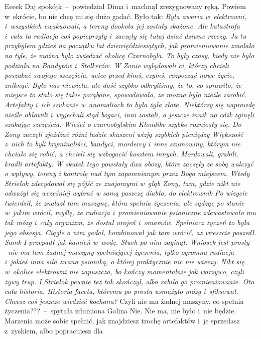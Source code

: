 \documentclass[../MAIN.tex]{subfiles}
\begin{document}
\xx  Eeee\3k Daj spokój\3k~--~powiedział Dima i~machnął zrezygnowany ręką.
Powiem w~skrócie, bo nie chcę mi się dużo gadać. Było tak:
\qd
\textsl{Była awaria w~elektrowni, i~wszystkich ewakuowali, a tereny dookoła jej
zostały
skażone. Ale katastrofa i~cała ta radiacja coś popieprzyły i~zaczęły się tutaj
dziać dziwne rzeczy. Ja tu przybyłem gdzieś na początku lat dziewięćdziesiątych,
jak promieniowanie zmalało na tyle, że można było zwiedzać okolicę Czarnobyla.
To były czasy, kiedy nie było podziału na Bandytów i~Stalkerów. W Zonie
wylądowali ci, którzy chcieli poszukać swojego szczęścia, uciec przed kimś,
czymś, rozpocząć nowe życie, zniknąć. Było nas niewielu, ale dość szybko
odkryliśmy, że to, co sprawiło, że miejsce to stało się takie porąbane,
spowodowało, że można było nieźle zarobić. Artefakty i~ich szukanie w~anomaliach
to była żyła złota. Niektórzy się naprawdę nieźle obłowili i~wyjechali stąd
bogaci, inni zostali, a jeszcze inni\3k no cóż\3k zginęli szukając
szczęścia. Wieści o czarnobylskim Klondike szybko rozniosły się. Do Zony zaczęli
zjeżdżać różni ludzie skuszeni wizją szybkich pieniędzy Większość z~nich to byli
kryminaliści, bandyci, mordercy i~inne szumowiny, którym nie chciało się robić,
a chcieli się wzbogacić kosztem innych. Mordowali, grabili, kradli artefakty. W
skutek tego powstały dwa obozy, które zaczęły ze sobą walczyć o wpływy, tereny i
kontrolę nad tym zapomnianym przez Boga miejscem. Wtedy Striełok zdecydował się
pójść ze znajomymi w~głąb Zony, tam, gdzie nikt nie odważył się wcześniej wybrać
w samą paszczę diabła, do elektrowni\3k Po wizycie twierdził, że znalazł
tam maszynę, która spełnia życzenia, ale sądząc po stanie w~jakim wrócił, myślę,
że radiacja i~promieniowanie psioniczne zdewastowało mu tak mózg i~cały
organizm, że dostał urojeń i~omamów. Spełniacz życzeń to była jego obsesja.
Ciągle o nim gadał, kombinował jak tam wrócić, aż wreszcie poszedł. Sam\3k I
przepadł jak kamień w~wodę. Słuch po nim zaginął.
Wniosek jest prosty~--~nie ma
tam żadnej maszyny spełniającej życzenia, tylko ogromna radiacja i~jakieś inna
siła zwana psioniką, o której praktycznie nic nie wiemy. Nikt się w~okolice
elektrowni nie zapuszcza, bo kończy momentalnie jak warzywo, czyli żywy trup. I
Striełok pewnie też tak skończył, albo zabiło go promieniowanie. Oto cała
historia. Historia faceta, któremu po prostu usmażyło mózg i~sfiksował. Chcesz
coś jeszcze wiedzieć kochana?}
\sx
Czyli nie ma żadnej maszyny, co spełnia życzenia???~--~spytała zdumiona
Galina
\xx  Nie. Nie ma, nie było i~nie będzie. Marzenia może sobie spełnić, jak
znajdziesz trochę artefaktów i~je sprzedasz z~zyskiem, albo popracujesz dla
\end{document}
